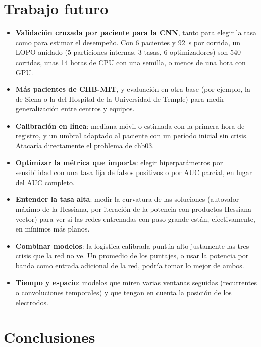 \section{Trabajo futuro}

\begin{itemize}
  \item \textbf{Validación cruzada por paciente para la CNN}, tanto para elegir la tasa como para estimar el desempeño. Con
        6 pacientes y 92~s por corrida, un LOPO anidado (5 particiones internas, 3 tasas, 6 optimizadores) son 540 corridas,
        unas 14 horas de CPU con una semilla, o menos de una hora con GPU.
  \item \textbf{Más pacientes de CHB-MIT}, y evaluación en otra base (por ejemplo, la de Siena o la del Hospital de la
        Universidad de Temple) para medir generalización entre centros y equipos.
  \item \textbf{Calibración en línea}: mediana móvil o estimada con la primera hora de registro, y un umbral adaptado al
        paciente con un período inicial sin crisis. Atacaría directamente el problema de chb03.
  \item \textbf{Optimizar la métrica que importa}: elegir hiperparámetros por sensibilidad con una tasa fija de falsos
        positivos o por AUC parcial, en lugar del AUC completo.
  \item \textbf{Entender la tasa alta}: medir la curvatura de las soluciones (autovalor máximo de la Hessiana, por iteración de
        la potencia con productos Hessiana-vector) para ver si las redes entrenadas con paso grande están, efectivamente, en
        mínimos más planos.
  \item \textbf{Combinar modelos}: la logística calibrada puntúa alto justamente las tres crisis que la red no ve. Un promedio
        de los puntajes, o usar la potencia por banda como entrada adicional de la red, podría tomar lo mejor de ambos.
  \item \textbf{Tiempo y espacio}: modelos que miren varias ventanas seguidas (recurrentes o convoluciones temporales) y que
        tengan en cuenta la posición de los electrodos.
\end{itemize}

\section{Conclusiones}

